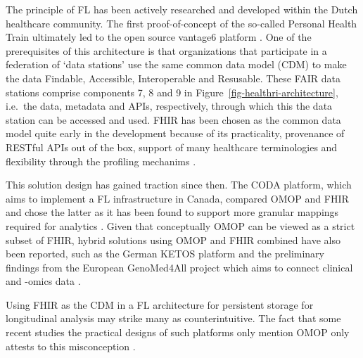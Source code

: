 \documentclass[
  authoryear]{elsarticle}
\begin{document}
The principle of FL has been actively researched and developed within
the Dutch healthcare community. The first proof-of-concept of the
so-called Personal Health Train \citep{vansoest2018using} ultimately led
to the open source vantage6 platform \citep{smits2022improved}. One of
the prerequisites of this architecture is that organizations that
participate in a federation of `data stations' use the same common data
model (CDM) to make the data Findable, Accessible, Interoperable and
Resusable. These FAIR data stations comprise components 7, 8 and 9 in
Figure~\ref{fig-healthri-architecture}, i.e.~the data, metadata and
APIs, respectively, through which this the data station can be accessed
and used. FHIR has been chosen as the common data model quite early in
the development because of its practicality, provenance of RESTful APIs
out of the box, support of many healthcare terminologies and flexibility
through the profiling mechanims \citep{choudhury2020personal}.

This solution design has gained traction since then. The CODA platform,
which aims to implement a FL infrastructure in Canada, compared OMOP and
FHIR and chose the latter as it has been found to support more granular
mappings required for analytics \citep{mullie2023coda}. Given that
conceptually OMOP can be viewed as a strict subset of FHIR, hybrid
solutions using OMOP and FHIR combined have also been reported, such as
the German KETOS platform \citep{gruendner2019ketos} and the preliminary
findings from the European GenoMed4All project which aims to connect
clinical and -omics data \citep{cremonesi2023need}.

Using FHIR as the CDM in a FL architecture for persistent storage for
longitudinal analysis may strike many as counterintuitive. The fact that
some recent studies the practical designs of such platforms only mention
OMOP only attests to this misconception \citep{wong2022applying}.
\end{document}
